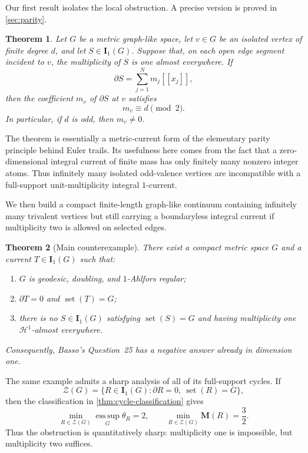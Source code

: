 \documentclass[11pt]{article}
\newtheorem{theorem}{Theorem}[section]
\theoremstyle{remark}
\newcommand{\M}{\mathbf M}
\newcommand{\I}{\mathbf I}
\newcommand{\Hh}{\mathcal H}
\newcommand{\set}{\operatorname{set}}
\newcommand{\llbracket}{[\![}
\newcommand{\rrbracket}{]\!]}
\begin{document}
Our first result isolates the local obstruction. A precise version is proved in \cref{sec:parity}.

\begin{theorem}\label{thm:parity-intro}
Let $G$ be a metric graph-like space, let $v\in G$ be an isolated vertex of finite degree $d$, and let $S\in\I_1(G)$. Suppose that, on each open edge segment incident to $v$, the multiplicity of $S$ is one almost everywhere. If
\[
    \partial S=\sum_{j=1}^N m_j\llbracket x_j\rrbracket,
\]
then the coefficient $m_v$ of $\partial S$ at $v$ satisfies
\[
    m_v\equiv d\pmod 2.
\]
In particular, if $d$ is odd, then $m_v\neq 0$.
\end{theorem}

The theorem is essentially a metric-current form of the elementary parity principle behind Euler trails. Its usefulness here comes from the fact that a zero-dimensional integral current of finite mass has only finitely many nonzero integer atoms. Thus infinitely many isolated odd-valence vertices are incompatible with a full-support unit-multiplicity integral $1$-current.

We then build a compact finite-length graph-like continuum containing infinitely many trivalent vertices but still carrying a boundaryless integral current if multiplicity two is allowed on selected edges.

\begin{theorem}[Main counterexample]\label{thm:main-intro}
There exist a compact metric space $G$ and a current $T\in\I_1(G)$ such that:
\begin{enumerate}[label=\textup{(\roman*)}]
\item $G$ is geodesic, doubling, and $1$-Ahlfors regular;
\item $\partial T=0$ and $\set(T)=G$;
\item there is no $S\in\I_1(G)$ satisfying $\set(S)=G$ and having multiplicity one $\Hh^1$-almost everywhere.
\end{enumerate}
Consequently, Basso's Question~25 has a negative answer already in dimension one.
\end{theorem}

The same example admits a sharp analysis of all of its full-support cycles. If
\[
 \mathscr Z(G)=\{R\in\I_1(G):\partial R=0,\ \set(R)=G\},
\]
then the classification in \cref{thm:cycle-classification} gives
\begin{equation}\label{eq:intro-sharp}
 \min_{R\in\mathscr Z(G)}
 \operatorname*{ess\,sup}_{G}\theta_R=2,
 \qquad
 \min_{R\in\mathscr Z(G)}\M(R)=\frac32.
\end{equation}
Thus the obstruction is quantitatively sharp: multiplicity one is impossible, but multiplicity two suffices.
\end{document}

